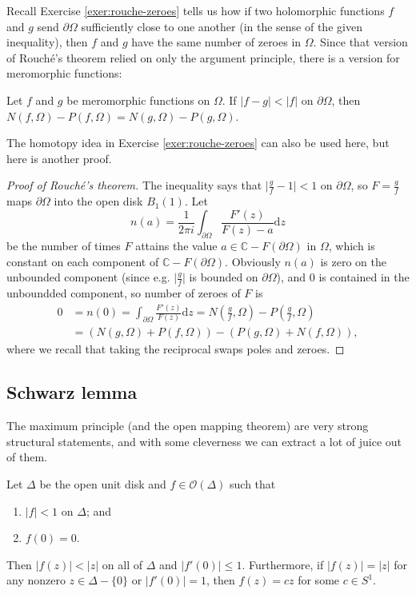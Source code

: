\documentclass[10pt]{article}
\providecommand{\dd}{\mathrm d}
\providecommand{\CC}{\mathbb C}
\providecommand{\ii}{\item}
\providecommand{\abs}[1]{\left\lvert{#1}\right\rvert}
\providecommand{\smabs}[1]{\lvert{#1}\rvert}
\begin{document}
Recall Exercise \ref{exer:rouche-zeroes} tells us how
if two holomorphic functions $f$ and $g$ send $\partial\Omega$
sufficiently close to one another (in the sense of the given inequality),
then $f$ and $g$ have the same number of zeroes in $\Omega$.
Since that version of Rouch\'e's theorem relied on
only the argument principle, there is a version for meromorphic functions:
\begin{theorem}
    \label{thm:rouches-theorem}
    Let $f$ and $g$ be meromorphic functions on $\Omega$.
    If $\abs{f-g}<\abs f$ on $\partial\Omega$, then
    $N(f,\Omega) - P(f,\Omega) = N(g,\Omega) - P(g,\Omega)$.
\end{theorem}

The homotopy idea in Exercise \ref{exer:rouche-zeroes}
can also be used here, but here is another proof.

\begin{proof}
    [Proof of Rouch\'e's theorem]
    The inequality says that $\smabs{\frac gf - 1} < 1$
    on $\partial\Omega$, so $F = \frac gf$ maps $\partial\Omega$
    into the open disk $B_1(1)$. Let
    \begin{equation*}
	n(a) =\frac 1{2\pi i}\int_{\partial\Omega}\frac{F'(z)}{F(z)-a}\dd z
    \end{equation*}
    be the number of times $F$ attains the value
    $a\in\CC - F(\partial\Omega)$ in $\Omega$,
    which is constant on each component of $\CC - F(\partial\Omega)$.
    Obviously $n(a)$ is zero on the unbounded component
    (since e.g. $\smabs{\frac gf}$ is bounded on $\partial\Omega$),
    and $0$ is contained in the unboundded component,
    so number of zeroes of $F$ is
    \begin{align*}
	0
	&= n(0) = \int_{\partial\Omega}\frac{F'(z)}{F(z)}\dd z
	= N\left(\frac gf,\Omega\right) - P\left(\frac gf,\Omega\right)\\
	&= (N(g,\Omega) + P(f,\Omega))
	- (P(g,\Omega) + N(f,\Omega)),
    \end{align*}
    where we recall that taking the reciprocal swaps poles and zeroes.
\end{proof}



\subsection{Schwarz lemma}
The maximum principle (and the open mapping theorem)
are very strong structural statements,
and with some cleverness we can extract a lot of juice out of them.
\begin{theorem}
    \label{thm:schwarz-lemma}
    Let $\Delta$ be the open unit disk
    and $f\in\mathcal O(\Delta)$ such that
    \begin{enumerate}[(1)]
	\ii $\abs{f} < 1$ on $\Delta$; and
	\ii $f(0) = 0$.
    \end{enumerate}
    Then $\abs{f(z)} < \abs{z}$ on all of $\Delta$
    and $\abs{f'(0)} \le 1$. Furthermore, if $\abs{f(z)} = \abs z$
    for any nonzero $z\in\Delta-\{0\}$ or $\abs{f'(0)} = 1$,
    then $f(z) = cz$ for some $c\in S^1$.
\end{theorem}
\end{document}
